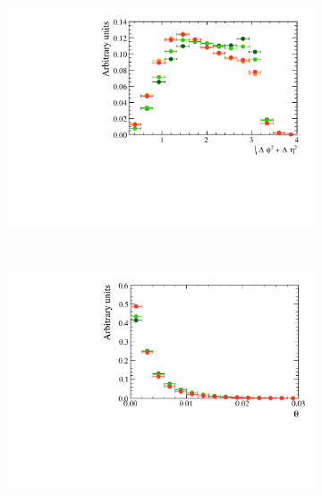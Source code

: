 \begin{figure}
    \centering
    \begin{subfigure}[b]{0.48\textwidth}
        \includegraphics[trim={12cm 0 0 0},clip, width=\textwidth]{./Figs/Appendix1/signal_DeltaR.pdf}
    \end{subfigure}
    ~ %
    \begin{subfigure}[b]{0.48\textwidth}
       \includegraphics[width=\textwidth]{./Figs/Appendix1/signal_DIRA.pdf}
    \end{subfigure}




\end{figure}
